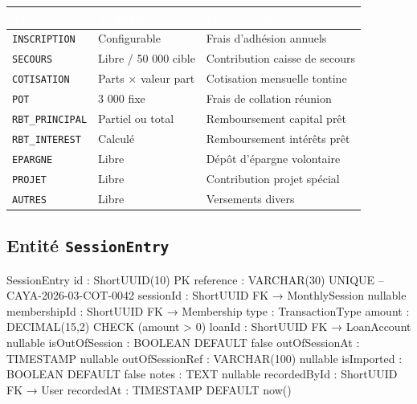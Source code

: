 \documentclass[12pt, a4paper]{report}
\begin{document}
\begin{center}
\begin{tabular}{L{3.5cm}L{4cm}L{5.5cm}}
  \toprule
  \textcolor{white}{\textbf{Type}} &
  \textcolor{white}{\textbf{Montant}} &
  \textcolor{white}{\textbf{Description}} \\
  \midrule
  \texttt{INSCRIPTION}    & Configurable         & Frais d'adhésion annuels \\
  \texttt{SECOURS}        & Libre / 50 000 cible & Contribution caisse de secours \\
  \texttt{COTISATION}     & Parts × valeur part  & Cotisation mensuelle tontine \\
  \texttt{POT}            & 3 000 fixe           & Frais de collation réunion \\
  \texttt{RBT\_PRINCIPAL} & Partiel ou total     & Remboursement capital prêt \\
  \texttt{RBT\_INTEREST}  & Calculé              & Remboursement intérêts prêt \\
  \texttt{EPARGNE}        & Libre                & Dépôt d'épargne volontaire \\
  \texttt{PROJET}         & Libre                & Contribution projet spécial \\
  \texttt{AUTRES}         & Libre                & Versements divers \\
  \bottomrule
\end{tabular}
\end{center}

\subsection{Entité \texttt{SessionEntry}}

\begin{codeBox}
SessionEntry {
  id                : ShortUUID(10)     PK
  reference         : VARCHAR(30)       UNIQUE  -- CAYA-2026-03-COT-0042
  sessionId         : ShortUUID FK → MonthlySession  nullable
  membershipId      : ShortUUID         FK → Membership
  type              : TransactionType
  amount            : DECIMAL(15,2)     CHECK (amount > 0)
  loanId            : ShortUUID FK → LoanAccount  nullable
  isOutOfSession    : BOOLEAN           DEFAULT false
  outOfSessionAt    : TIMESTAMP         nullable
  outOfSessionRef   : VARCHAR(100)      nullable
  isImported        : BOOLEAN           DEFAULT false
  notes             : TEXT              nullable
  recordedById      : ShortUUID         FK → User
  recordedAt        : TIMESTAMP         DEFAULT now()
}
\end{codeBox}
\end{document}
